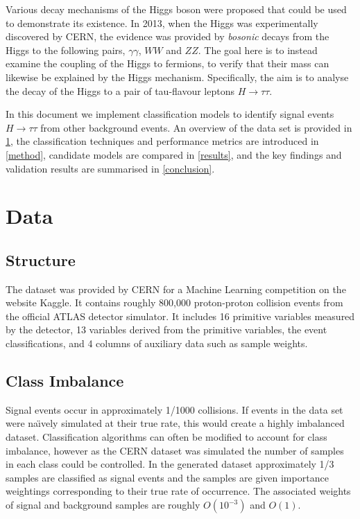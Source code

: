 Various decay mechanisms of the Higgs boson were proposed that could be used to demonstrate its existence. In 2013, when the Higgs was experimentally discovered by CERN, the evidence was provided by \emph{bosonic} decays from the Higgs to the following pairs, $\gamma\gamma$, $WW$ and $ZZ$. The goal here is to instead examine the coupling of the Higgs to fermions, to verify that their mass can likewise be explained by the Higgs mechanism. Specifically, the aim is to analyse the decay of the Higgs to a pair of tau-flavour leptons $H\rightarrow\tau\tau$.

In this document we implement classification models to identify signal events $H\rightarrow\tau\tau$ from other background events. An overview of the data set is provided in \ref{data}, the classification techniques and performance metrics are introduced in \ref{method}, candidate models are compared in \ref{results}, and the key findings and validation results are summarised in \ref{conclusion}.

\section{Data}
\label{data}
\subsection{Structure}
The dataset was provided by CERN for a Machine Learning competition on the website Kaggle. It contains roughly 800,000 proton-proton collision events from the official ATLAS detector simulator. It includes 16 primitive variables measured by the detector, 13 variables derived from the primitive variables, the event classifications, and 4 columns of auxiliary data such as sample weights. 

\subsection{Class Imbalance}
Signal events occur in approximately 1/1000 collisions. If events in the data set were na\"{\i}vely simulated at their true rate, this would create a highly imbalanced dataset. Classification algorithms can often be modified to account for class imbalance, however as the CERN dataset was simulated the number of samples in each class could be controlled. In the generated dataset approximately 1/3 samples are classified as signal events and the samples are given importance weightings corresponding to their true rate of occurrence. The associated weights of signal and background samples are roughly $O(10^{-3})$ and $O(1)$.

